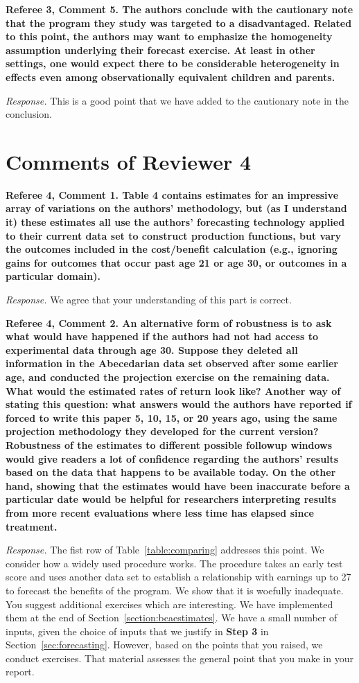 \noindent \textbf{Referee 3, Comment 5. The authors conclude with the cautionary note that the program they study was targeted to a disadvantaged. Related to this point, the authors may want to emphasize the homogeneity assumption underlying their forecast exercise. At least in other settings, one would expect there to be considerable heterogeneity in effects even among observationally equivalent children and parents.}

\noindent \textit{Response.} This is a good point that we have added to the cautionary note in the conclusion.

\section*{Comments of Reviewer 4}

\noindent \textbf{Referee 4, Comment 1. Table 4 contains estimates for an impressive array of variations on the authors' methodology, but (as I understand it) these estimates all use the authors' forecasting technology applied to their current data set to construct production functions, but vary the outcomes included in the cost/benefit calculation (e.g., ignoring gains for outcomes that occur past age 21 or age 30, or outcomes in a particular domain).}

\noindent \textit{Response.} We agree that your understanding of this part is correct.

\noindent \textbf{Referee 4, Comment 2. An alternative form of robustness is to ask what would have happened if the authors had not had access to experimental data through age 30. Suppose they deleted all information in the Abecedarian data set observed after some earlier age, and conducted the projection exercise on the remaining data. What would the estimated rates of return look like? Another way of stating this question: what answers would the authors have reported if forced to write this paper 5, 10, 15, or 20 years ago, using the same projection methodology they developed for the current version? Robustness of the estimates to different possible followup windows would give readers a lot of confidence regarding the authors' results based on the data that happens to be available today. On the other hand, showing that the estimates would have been inaccurate before a particular date would be helpful for researchers interpreting results from more recent evaluations where less time has elapsed since treatment.}

\noindent \textit{Response.} The fist row of Table~\ref{table:comparing} addresses this point. We consider how a widely used procedure works. The procedure takes an early test score and uses another data set to establish a relationship with earnings up to 27 to forecast the benefits of the program. We show that it is woefully inadequate. You suggest additional exercises which are interesting. We have implemented them at the end of Section~\ref{section:bcaestimates}. We have a small number of inputs, given the choice of inputs that we justify in \textbf{Step 3} in Section~\ref{sec:forecasting}. However, based on the points that you raised, we conduct exercises. That material assesses the general point that you make in your report.


